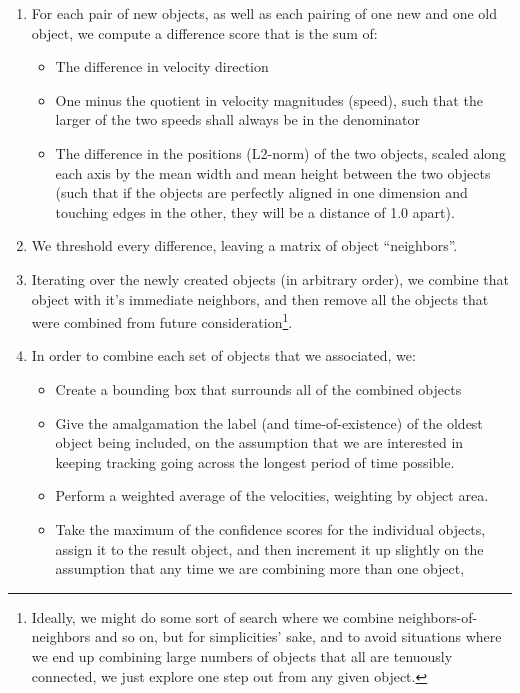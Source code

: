 \documentclass{article}
\begin{document}
\begin{enumerate}
\item For each pair of new objects, as well as each pairing of one new and one
      old object, we compute a difference score that is the sum of:
  \begin{itemize}
  \item The difference in velocity direction
  \item One minus the quotient in velocity magnitudes (speed), such that the
        larger of the two speeds shall always be in the denominator
  \item The difference in the positions (L2-norm) of the two objects, scaled
        along each axis by the mean width and mean height between the two
        objects (such that if the objects are perfectly aligned in one dimension
        and touching edges in the other, they will be a distance of 1.0 apart).
  \end{itemize}
\item We threshold every difference, leaving a matrix of object ``neighbors''.
\item Iterating over the newly created objects (in arbitrary order), we
      combine that object with it's immediate neighbors, and then remove
      all the objects that were combined from future
      consideration\footnote{Ideally, we might do some sort of search where we
      combine neighbors-of-neighbors and so on, but for simplicities' sake, and
      to avoid situations where we end up combining large numbers of objects
      that all are tenuously connected, we just explore one step out from any
      given object.}.
\item In order to combine each set of objects that we associated, we:
  \begin{itemize}
    \item Create a bounding box that surrounds all of the combined objects
    \item Give the amalgamation the label (and time-of-existence) of the oldest
          object being included, on the assumption that we are interested
          in keeping tracking going across the longest period of time possible.
    \item Perform a weighted average of the velocities, weighting by object area.
    \item Take the maximum of the confidence scores for the individual objects,
          assign it to the result object, and then increment it up slightly on
          the assumption that any time we are combining more than one object,

\end{itemize}
\end{enumerate}
\end{document}
